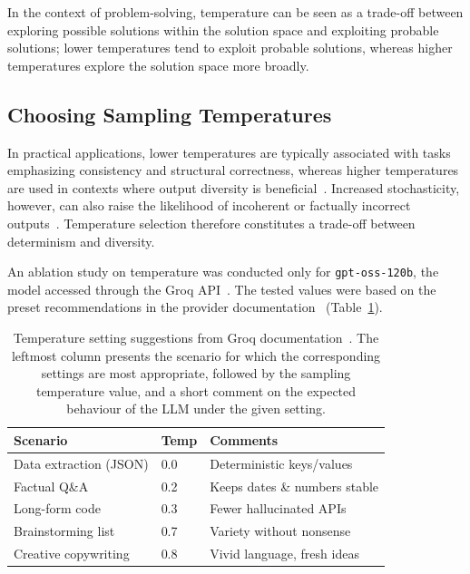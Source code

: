 \documentclass[../../main]{subfiles}
\begin{document}
In the context of problem-solving, temperature can be seen as a trade-off between exploring possible solutions within the solution space and exploiting probable solutions; lower temperatures tend to exploit probable solutions, whereas higher temperatures explore the solution space more broadly.

\subsection{Choosing Sampling Temperatures}

In practical applications, lower temperatures are typically associated with tasks emphasizing consistency and structural correctness, whereas higher temperatures are used in contexts where output diversity is beneficial~\cite{PromptingWithLLM}. Increased stochasticity, however, can also raise the likelihood of incoherent or factually incorrect outputs~\cite{LLMhallucination}. Temperature selection therefore constitutes a trade-off between determinism and diversity.

An ablation study on temperature was conducted only for \texttt{gpt-oss-120b}, the model accessed through the Groq API~\cite{GroqAPI}. The tested values were based on the preset recommendations in the provider documentation~\cite{GroqAPIdoc} (Table~\ref{tab:tempSets}).

\begin{table}[ht]
    \centering
    \begin{tabular}{lll}
    \hline
        Scenario & Temp & Comments \\ \hline
        Data extraction (JSON) & 0.0 & Deterministic keys/values \\
        Factual Q\&A & 0.2 & Keeps dates \& numbers stable \\         
        Long-form code & 0.3 & Fewer hallucinated APIs \\ 
        Brainstorming list & 0.7 & Variety without nonsense \\ 
        Creative copywriting & 0.8 & Vivid language, fresh ideas \\ 
        \hline
    \end{tabular}
    \caption{Temperature setting suggestions from Groq documentation~\cite{GroqAPIdoc}. The leftmost column presents the scenario for which the corresponding settings are most appropriate, followed by the sampling temperature value, and a short comment on the expected behaviour of the LLM under the given setting.}
    \label{tab:tempSets}
\end{table}
\end{document}
